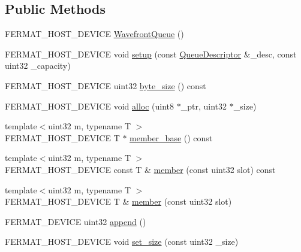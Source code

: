 \subsection*{Public Methods}
\begin{DoxyCompactItemize}
\item 
F\+E\+R\+M\+A\+T\+\_\+\+H\+O\+S\+T\+\_\+\+D\+E\+V\+I\+CE \hyperlink{struct_wavefront_queue_a72e7cde3303ee1b9e5feefe1e9509d7b}{Wavefront\+Queue} ()
\item 
F\+E\+R\+M\+A\+T\+\_\+\+H\+O\+S\+T\+\_\+\+D\+E\+V\+I\+CE void \hyperlink{struct_wavefront_queue_a36ce24d3826d182bce55280ddb4326c2}{setup} (const \hyperlink{struct_queue_descriptor}{Queue\+Descriptor} \&\+\_\+desc, const uint32 \+\_\+capacity)
\item 
F\+E\+R\+M\+A\+T\+\_\+\+H\+O\+S\+T\+\_\+\+D\+E\+V\+I\+CE uint32 \hyperlink{struct_wavefront_queue_a52f11e946e67999d653b56a8adb86b37}{byte\+\_\+size} () const
\item 
F\+E\+R\+M\+A\+T\+\_\+\+H\+O\+S\+T\+\_\+\+D\+E\+V\+I\+CE void \hyperlink{struct_wavefront_queue_ae6763ab00a424dd1dbfe10f489ca1bb2}{alloc} (uint8 $\ast$\+\_\+ptr, uint32 $\ast$\+\_\+size)
\item 
{\footnotesize template$<$uint32 m, typename T $>$ }\\F\+E\+R\+M\+A\+T\+\_\+\+H\+O\+S\+T\+\_\+\+D\+E\+V\+I\+CE T $\ast$ \hyperlink{struct_wavefront_queue_a9eff696988c46605850fbe533f41ef77}{member\+\_\+base} () const
\item 
{\footnotesize template$<$uint32 m, typename T $>$ }\\F\+E\+R\+M\+A\+T\+\_\+\+H\+O\+S\+T\+\_\+\+D\+E\+V\+I\+CE const T \& \hyperlink{struct_wavefront_queue_a3940005c37bd9db240f4adbcdfebd246}{member} (const uint32 slot) const
\item 
{\footnotesize template$<$uint32 m, typename T $>$ }\\F\+E\+R\+M\+A\+T\+\_\+\+H\+O\+S\+T\+\_\+\+D\+E\+V\+I\+CE T \& \hyperlink{struct_wavefront_queue_a26d5b5f09cbb494c6df903b0811b77de}{member} (const uint32 slot)
\item 
F\+E\+R\+M\+A\+T\+\_\+\+D\+E\+V\+I\+CE uint32 \hyperlink{struct_wavefront_queue_af2c7120756267c5cd6bf51b0d98465fd}{append} ()
\item 
F\+E\+R\+M\+A\+T\+\_\+\+H\+O\+S\+T\+\_\+\+D\+E\+V\+I\+CE void \hyperlink{struct_wavefront_queue_a460794255be37c42cace2c69422f19b1}{set\+\_\+size} (const uint32 \+\_\+size)
\end{DoxyCompactItemize}
